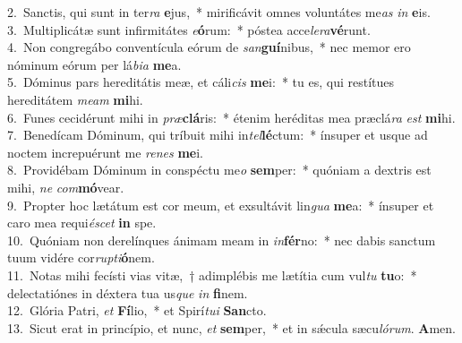 {2.~}Sanctis, qui sunt in ter\textit{ra} \textbf{e}jus,~* mirificávit omnes voluntátes me\textit{as} \textit{in} \textbf{e}is.\\
{3.~}Multiplicátæ sunt infirmitátes \textit{e}\textbf{ó}rum:~* póstea acce\textit{le}\textit{ra}\textbf{vé}runt.\\
{4.~}Non congregábo conventícula eórum de \textit{san}\textbf{guí}nibus,~* nec memor ero nóminum eórum per lá\textit{bi}\textit{a} \textbf{me}a.\\
{5.~}Dóminus pars hereditátis meæ, et cáli\textit{cis} \textbf{me}i:~* tu es, qui restítues hereditátem \textit{me}\textit{am} \textbf{mi}hi.\\
{6.~}Funes cecidérunt mihi in \textit{præ}\textbf{clá}ris:~* étenim heréditas mea præclá\textit{ra} \textit{est} \textbf{mi}hi.\\
{7.~}Benedícam Dóminum, qui tríbuit mihi in\textit{tel}\textbf{lé}ctum:~* ínsuper et usque ad noctem increpuérunt me \textit{re}\textit{nes} \textbf{me}i.\\
{8.~}Providébam Dóminum in conspéctu me\textit{o} \textbf{sem}per:~* quóniam a dextris est mihi, \textit{ne} \textit{com}\textbf{mó}vear.\\
{9.~}Propter hoc lætátum est cor meum, et exsultávit lin\textit{gua} \textbf{me}a:~* ínsuper et caro mea requi\textit{é}\textit{scet} \textbf{in} spe.\\
{10.~}Quóniam non derelínques ánimam meam in \textit{in}\textbf{fér}no:~* nec dabis sanctum tuum vidére cor\textit{rup}\textit{ti}\textbf{ó}nem.\\
{11.~}Notas mihi fecísti vias vitæ,~† adimplébis me lætítia cum vul\textit{tu} \textbf{tu}o:~* delectatiónes in déxtera tua us\textit{que} \textit{in} \textbf{fi}nem.\\
{12.~}Glória Patri, \textit{et} \textbf{Fí}lio,~* et Spirí\textit{tu}\textit{i} \textbf{San}cto.\\
{13.~}Sicut erat in princípio, et nunc, \textit{et} \textbf{sem}per,~* et in sǽcula sæcu\textit{ló}\textit{rum}. \textbf{A}men.\\
